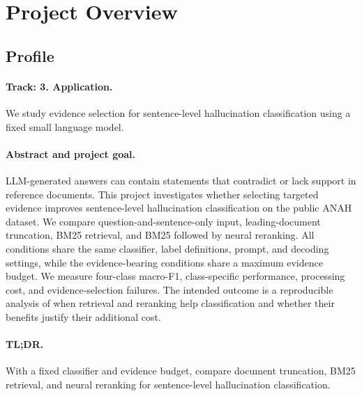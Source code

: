\section{Project Overview}
\label{section:intro}
\subsection{Profile}
\paragraph{Track: 3. Application.}
We study evidence selection for sentence-level hallucination classification using a fixed small language model.

\paragraph{Abstract and project goal.}
LLM-generated answers can contain statements that contradict or lack support in reference documents.
This project investigates whether selecting targeted evidence improves sentence-level hallucination classification on the public ANAH dataset.
We compare question-and-sentence-only input, leading-document truncation, BM25 retrieval, and BM25 followed by neural reranking.
All conditions share the same classifier, label definitions, prompt, and decoding settings, while the evidence-bearing conditions share a maximum evidence budget.
We measure four-class macro-F1, class-specific performance, processing cost, and evidence-selection failures.
The intended outcome is a reproducible analysis of when retrieval and reranking help classification and whether their benefits justify their additional cost.

\paragraph{TL;DR.}
With a fixed classifier and evidence budget, compare document truncation, BM25 retrieval, and neural reranking for sentence-level hallucination classification.

